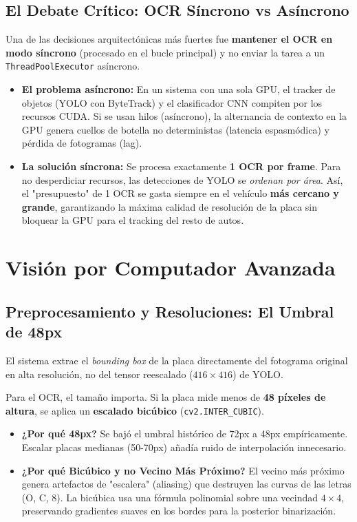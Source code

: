 \documentclass[11pt,a4paper]{article}
\begin{document}
\subsection{El Debate Cr\'itico: OCR S\'incrono vs As\'incrono}
Una de las decisiones arquitect\'onicas m\'as fuertes fue \textbf{mantener el OCR en modo s\'incrono} (procesado en el bucle principal) y no enviar la tarea a un \texttt{ThreadPoolExecutor} as\'incrono.

\begin{itemize}
    \item \textbf{El problema as\'incrono:} En un sistema con una sola GPU, el tracker de objetos (YOLO con ByteTrack) y el clasificador CNN compiten por los recursos CUDA. Si se usan hilos (as\'incrono), la alternancia de contexto en la GPU genera cuellos de botella no deterministas (latencia espasm\'odica) y p\'erdida de fotogramas (lag).
    \item \textbf{La soluci\'on s\'incrona:} Se procesa exactamente \textbf{1 OCR por frame}. Para no desperdiciar recursos, las detecciones de YOLO se \emph{ordenan por \'area}. As\'i, el "presupuesto" de 1 OCR se gasta siempre en el veh\'iculo \textbf{m\'as cercano y grande}, garantizando la m\'axima calidad de resoluci\'on de la placa sin bloquear la GPU para el tracking del resto de autos.
\end{itemize}

\section{Visi\'on por Computador Avanzada}

\subsection{Preprocesamiento y Resoluciones: El Umbral de 48px}
El sistema extrae el \emph{bounding box} de la placa directamente del fotograma original en alta resoluci\'on, no del tensor reescalado ($416\times416$) de YOLO.

Para el OCR, el tama\~no importa. Si la placa mide menos de \textbf{48 p\'ixeles de altura}, se aplica un \textbf{escalado bic\'ubico} (\texttt{cv2.INTER\_CUBIC}).
\begin{itemize}
    \item \textbf{¿Por qu\'e 48px?} Se baj\'o el umbral hist\'orico de 72px a 48px emp\'iricamente. Escalar placas medianas (50-70px) a\~nad\'ia ruido de interpolaci\'on innecesario.
    \item \textbf{¿Por qu\'e Bic\'ubico y no Vecino M\'as Pr\'oximo?} El vecino m\'as pr\'oximo genera artefactos de "escalera" (aliasing) que destruyen las curvas de las letras (O, C, 8). La bic\'ubica usa una f\'ormula polinomial sobre una vecindad $4\times4$, preservando gradientes suaves en los bordes para la posterior binarizaci\'on.
\end{itemize}
\end{document}
